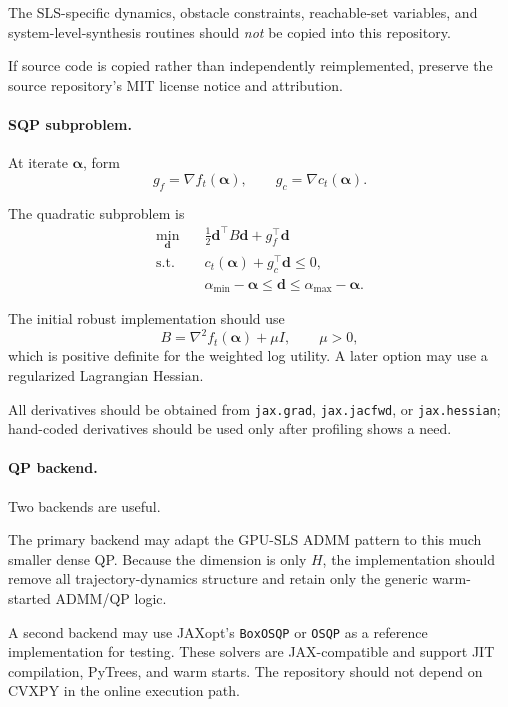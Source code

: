 \documentclass[11pt]{article}
\begin{document}
The SLS-specific dynamics, obstacle constraints, reachable-set variables, and
system-level-synthesis routines should \emph{not} be copied into this
repository.

If source code is copied rather than independently reimplemented, preserve
the source repository's MIT license notice and attribution.

\paragraph{SQP subproblem.}

At iterate $\bm\alpha$, form
\[
    g_f
    =
    \nabla f_t(\bm\alpha),
    \qquad
    g_c
    =
    \nabla c_t(\bm\alpha).
\]

The quadratic subproblem is
\begin{equation}
\begin{aligned}
    \min_{\bm d}\quad&
    \frac12
    \bm d^\top B\bm d
    +
    g_f^\top\bm d
    \\
    \text{s.t.}\quad&
    c_t(\bm\alpha)
    +
    g_c^\top\bm d
    \le0,
    \\
    &
    \alpha_{\min}-\bm\alpha
    \le
    \bm d
    \le
    \alpha_{\max}-\bm\alpha.
\end{aligned}
\label{eq:implementation-sqp-subproblem}
\end{equation}

The initial robust implementation should use
\[
    B
    =
    \nabla^2 f_t(\bm\alpha)
    +
    \mu I,
    \qquad
    \mu>0,
\]
which is positive definite for the weighted log utility.  A later option may
use a regularized Lagrangian Hessian.

All derivatives should be obtained from
\texttt{jax.grad}, \texttt{jax.jacfwd}, or \texttt{jax.hessian}; hand-coded
derivatives should be used only after profiling shows a need.

\paragraph{QP backend.}

Two backends are useful.

The primary backend may adapt the GPU-SLS ADMM pattern to this much smaller
dense QP.  Because the dimension is only $H$, the implementation should remove
all trajectory-dynamics structure and retain only the generic warm-started
ADMM/QP logic.

A second backend may use JAXopt's
\texttt{BoxOSQP} or \texttt{OSQP} as a reference implementation for testing.
These solvers are JAX-compatible and support JIT compilation, PyTrees, and
warm starts.  The repository should not depend on CVXPY in the online
execution path.
\end{document}
